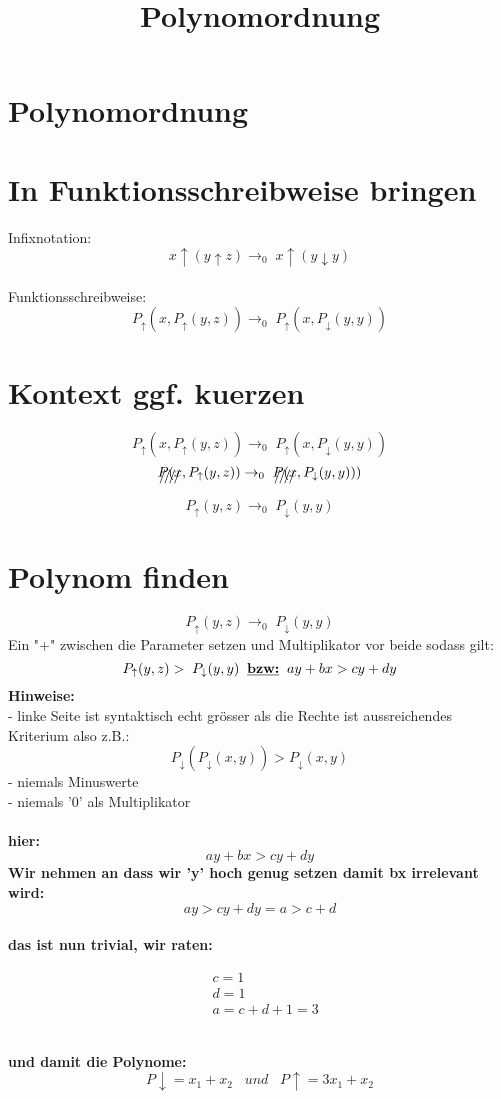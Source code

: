 \documentclass{article}
\title{Polynomordnung}
\date{}
\begin{document}
	\section*{Polynomordnung}
	\section{In Funktionsschreibweise bringen}
	Infixnotation:
	\[x \uparrow ( y \uparrow z) \rightarrow_{0}\; x \uparrow (y \downarrow y)\]\\
	Funktionsschreibweise:
	\[ P_{\uparrow}(x,P_{\uparrow}(y,z)) \rightarrow_{0} \; P_{\uparrow}(x,P_{\downarrow}(y,y))\]
	\section{Kontext ggf. kuerzen}
	\[ P_{\uparrow}(x,P_{\uparrow}(y,z)) \rightarrow_{0} \; P_{\uparrow}(x,P_{\downarrow}(y,y))\]
	\[\xout{P(x},P_{\uparrow}(y,z)) \rightarrow_{0} \; \xout{P(x},P_{\downarrow}(y,y)))\]
	\[P_{\uparrow}(y,z) \rightarrow_{0} \;P_{\downarrow}(y,y)\]
	\section{Polynom finden}
	\[P_{\uparrow}(y,z) \rightarrow_{0} \;P_{\downarrow}(y,y)\]
	Ein "+" zwischen die Parameter setzen und Multiplikator vor beide sodass gilt:
	\[P_{\uparrow}(y,z) > \;P_{\downarrow}(y,y)\;\;\textbf{\underline{bzw:}}\;\;ay+bx>cy+dy\]
	\textbf{Hinweise:}\\
	- linke Seite ist syntaktisch echt gr\"osser als die Rechte ist aussreichendes Kriterium also z.B.:
	\[ P_{\downarrow}( P_{\downarrow}(x,y) ) > P_{\downarrow}(x,y) \]
	- niemals Minuswerte \\
	- niemals '0' als Multiplikator\\\\
	\textbf{hier:}
		\[ay+bx>cy+dy\]
	\textbf{Wir nehmen an dass wir 'y' hoch genug setzen damit bx irrelevant wird:}\\
		\[ay>cy+dy = a>c+d \]
	\\ \textbf{das ist nun trivial, wir raten:}
	\begin{fleqn}
		\begin{align*}
			&c = 1 \\
			&d = 1 \\
			&a = c+d+1 = 3
		\end{align*}
	\end{fleqn} \\
	\textbf{und damit die Polynome:}\\
	\[P\downarrow = x_1+x_2 \;\;\; und \;\;\; P\uparrow = 3x_1+x_2 \] \\
\end{document}
